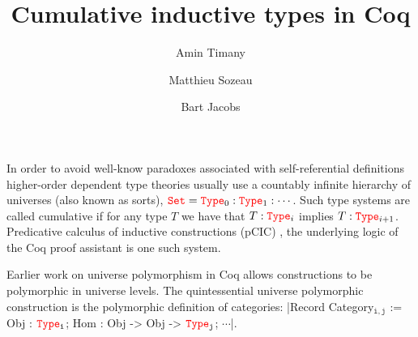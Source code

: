 \documentclass{easychair}
\title{Cumulative inductive types in Coq}
\author{
Amin Timany\inst{1}
\and
Matthieu Sozeau\inst{2}
\and
Bart Jacobs\inst{1}
}
\institute{
imec-Distrinet, KU Leuven, Belgium
\and
irif, Inria Paris, France
 }
\newcommand{\Type}[1]{{\color{red} \mathtt{Type}}_{#1}}
\newcommand{\Set}{{\color{red} \mathtt{Set}}}
\begin{document}
\maketitle

In order to avoid well-know paradoxes associated with self-referential
definitions higher-order dependent type theories usually use a
countably infinite hierarchy of universes (also known as sorts),
$\Set = \Type{0} : \Type{1} : \cdots$. Such type systems are called
cumulative if for any type $T$ we have that $T : \Type{i}$ implies
$T : \Type{i+1}$. Predicative calculus of inductive constructions
(pCIC) \cite{coq, DBLP:journals/corr/abs-1111-0123}, the underlying logic of the Coq proof assistant is one such
system.

Earlier work \cite{DBLP:conf/itp/SozeauT14} on universe polymorphism
in Coq allows constructions to be polymorphic in universe levels.  The
quintessential universe polymorphic construction is the polymorphic definition of
categories:
\Coqe|Record Category$_{\mathtt{i, j}}$ := {Obj : $\Type{\mathtt{i}}$; Hom : Obj -> Obj -> $\Type{\mathtt{j}}$; $\cdots$}|.\footnotemark{}
\end{document}
